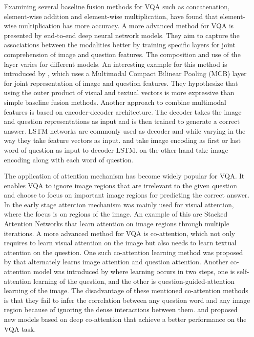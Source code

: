 \documentclass{article}
\begin{document}
Examining several baseline fusion methods for VQA such as concatenation, element-wise addition and element-wise multiplication, \cite{malinowski2017ask} have found that element-wise multiplication has more accuracy. A more advanced method for VQA is presented by end-to-end deep neural network models. They aim to capture the associations between the modalities better by training specific layers for joint comprehension of image and question features. The composition and use of the layer varies for different models. An interesting example for this method is introduced by \cite{fukui2016multimodal}, which uses a Multimodal Compact Bilinear Pooling (MCB) layer for joint representation of image and question features. They hypothesize that using the outer product of visual and textual vectors is more expressive than simple baseline fusion methods. Another approach to combine multimodal features is based on encoder-decoder architecture. The decoder takes the image and question representations as input and is then trained to generate a correct answer. LSTM networks are commonly used as decoder and while varying in the way they take feature vectors as input. \cite{ren2015exploring} and \cite{zhu2016cvpr} take image encoding as first or last word of question as input to decoder LSTM. \cite{malinowski2017ask} on the other hand take image encoding along with each word of question.

The application of attention mechanism has become widely popular for VQA. It enables VQA to ignore image regions that are irrelevant to the given question and choose to focus on important image regions for predicting the correct answer. In the early stage attention mechanism was mainly used for visual attention, where the focus is on regions of the image. An example of this are Stacked Attention Networks \citep{yang2016vqa} that learn attention on image regions through multiple iterations. A more advanced method for VQA is co-attention, which not only requires to learn visual attention on the image but also needs to learn textual attention on the question. One such co-attention learning method was proposed by \cite{lu2016hierarchical} that alternately learns image attention and question attention. Another co-attention model was introduced by \cite{yu2018beyond} where learning occurs in two steps, one is self-attention learning of the question, and the other is question-guided-attention learning of the image. The disadvantage of these mentioned co-attention methods is that they fail to infer the correlation between any question word and any image region because of ignoring the dense interactions between them. \cite{gao2019dynamic} and \cite{yu2019mcan} proposed new models based on deep co-attention that achieve a better performance on the VQA task.
\end{document}
